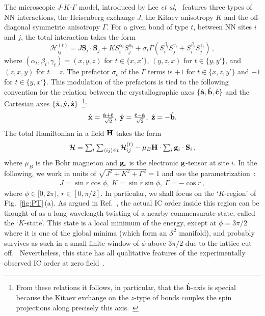 \documentclass[prx,aps,groupedaddress,twocolumn]{revtex4-1}
\def\be{\begin{equation}}
\def\ee{\end{equation}}
\def\vec{\mathbf}
\def\mc{\mathcal}
\begin{document}
The microscopic $J$-$K$-$\Gamma$ model, introduced by Lee {\it et al},~\cite{Lee2015,Lee2016} features three types of NN interactions, the Heisenberg exchange $J$, the Kitaev anisotropy $K$ and the off-diagonal symmetric anisotropy $\Gamma$. For a given bond of type $t$, between NN sites $i$ and $j$, the total interaction takes the form
\be
\mc{H}_{ij}^{(t)} = J \vec{S}_i\cdot \vec{S}_j
+ K S_i^{\alpha_t} S_j^{\alpha_t} 
+\sigma_t \Gamma (S_i^{\beta_t} S_j^{\gamma_t}+S_i^{\beta_t} S_j^{\gamma_t})\,,
\ee
%
where $(\alpha_t,\beta_t,\gamma_t)\!=\!(x,y,z)$ for $t\!\in\!\{x,x'\}$, 
$(y,z,x)$ for $t\!\in\!\{y,y'\}$, and $(z,x,y)$ for $t\!=\!z$. 
%
The prefactor $\sigma_t$ of the $\Gamma$ terms is $+1$ for $t\!\in\!\{x, z, y'\}$ and $-1$ for $t\!\in\!\{y,x'\}$.
%
This modulation of the prefactors is tied to the following convention for the relation between the crystallographic axes $\{\hat{{\bf a}}, \hat{{\bf b}},\hat{{\bf c}}\}$ and the Cartesian axes $\{\hat{{\bf x}}, \hat{{\bf y}}, \hat{{\bf z}}\}$~\footnote{From these relations it follows, in particular, that the $\hat{\bf b}$-axis is special because the Kitaev exchange on the $z$-type of bonds couples the spin projections along precisely this axis.~\cite{Ruiz2017}}:
\be
\label{eq:abc}
\begin{array}{c}
\hat{{\bf x}}=\frac{\hat{{\bf a}}+\hat{{\bf c}}}{\sqrt{2}}, ~
\hat{{\bf y}}=\frac{\hat{{\bf c}}-\hat{{\bf a}}}{\sqrt{2}}, ~
\hat{{\bf z}}=-\hat{{\bf b}}.
\end{array}
\ee
The total Hamiltonian in a field ${\bf H}$ takes the form
\be
\begin{array}{c}
\mc{H}=\sum_t \sum_{\langle ij\rangle \in t} \mc{H}_{ij}^{(t)} - \mu_B {\bf H} \cdot \sum_{i} {\bf g}_i \cdot {\bf S}_i\,,
\end{array}
\ee 
where $\mu_B$ is the Bohr magneton and ${\bf g}_i$ is the electronic ${\bf g}$-tensor at site $i$.
%
In the following, we work in units of $\sqrt{J^2\!+\!K^2\!+\!\Gamma^2}\!=\!1$ and use the parametrization~\cite{Lee2015,Lee2016,Sam2018}:
\be\label{eq:rphi}
\begin{array}{c}
J=\sin r \cos\phi, ~
K=\sin r \sin\phi, ~
\Gamma = -\cos r\,,
\end{array}\ee
where $\phi\!\in\![0,2\pi)$, $r\!\in\![0,\pi/2]$. 
%
In particular, we shall focus on the `$K$-region' of Fig.~\ref{fig:PT}\,(a). As argued in Ref.~\cite{Sam2018}, the actual IC order inside this region can be thought of as a long-wavelength twisting of a nearby commensurate state, called the `$K$-state'. This state is a local minimum of the energy, except at $\phi\!=\!3\pi/2$ where it is one of the global minima (which form an $\mc{S}^2$ manifold), and probably survives as such in a small finite window of $\phi$ above $3\pi/2$ due to the lattice cut-off.~\cite{Sam2018} Nevertheless, this state has all qualitative features of the experimentally observed IC order at zero field~\cite{Sam2018}.
\end{document}
